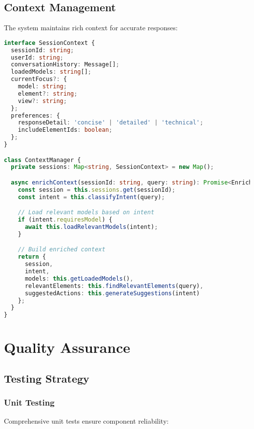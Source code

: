 \documentclass[12pt,a4paper]{report}
\begin{document}
\section{Context Management}

The system maintains rich context for accurate responses:

\begin{lstlisting}[language=TypeScript, caption=Context Management]
interface SessionContext {
  sessionId: string;
  userId: string;
  conversationHistory: Message[];
  loadedModels: string[];
  currentFocus?: {
    model: string;
    element?: string;
    view?: string;
  };
  preferences: {
    responseDetail: 'concise' | 'detailed' | 'technical';
    includeElementIds: boolean;
  };
}

class ContextManager {
  private sessions: Map<string, SessionContext> = new Map();

  async enrichContext(sessionId: string, query: string): Promise<EnrichedContext> {
    const session = this.sessions.get(sessionId);
    const intent = this.classifyIntent(query);

    // Load relevant models based on intent
    if (intent.requiresModel) {
      await this.loadRelevantModels(intent);
    }

    // Build enriched context
    return {
      session,
      intent,
      models: this.getLoadedModels(),
      relevantElements: this.findRelevantElements(query),
      suggestedActions: this.generateSuggestions(intent)
    };
  }
}
\end{lstlisting}

\chapter{Quality Assurance}

\section{Testing Strategy}

\subsection{Unit Testing}

Comprehensive unit tests ensure component reliability:
\end{document}
